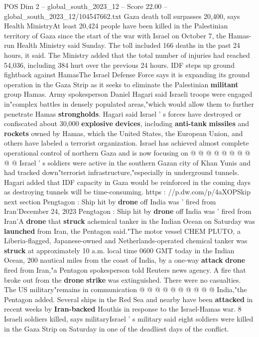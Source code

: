 \begin{textsample}{POS Dim 2 – global\_south\_2023\_12 – Score 22.00 – global\_south\_2023\_12/104547662.txt}  \label{ex:f2_pos_154}
Gaza death toll surpasses 20,400, says Health MinistryAt least 20,424 people have been killed in the Palestinian territory of Gaza since the start of the war with Israel on October 7, the Hamas-run Health Ministry said Sunday.
The toll included 166 deaths in the past 24 hours, it said.
The Ministry added that the total number of injuries had reached 54,036, including 384 hurt over the previous 24 hours.
IDF steps up ground fightback against HamasThe Israel Defense Force says it is expanding its ground operation in the Gaza Strip as it seeks to eliminate the Palestinian \textbf{militant} group Hamas.
Army spokesperson Daniel Hagari said Israeli troops were engaged in"complex battles in densely populated areas,"which would allow them to further penetrate Hamas \textbf{strongholds}.
Hagari said Israel ' s forces have destroyed or confiscated about 30,000 \textbf{explosive} \textbf{devices}, including \textbf{anti-tank} \textbf{missiles} and \textbf{rockets} owned by Hamas, which the United States, the European Union, and others have labeled a terrorist organization.
Israel has achieved almost complete operational control of northern Gaza and is now focusing on @ @ @ @ @ @ @ @ @ @ Israel ' s soldiers were active in the southern Gazan city of Khan Yunis and had tracked down"terrorist infrastructure,"especially in underground tunnels.
Hagari added that IDF capacity in Gaza would be reinforced in the coming days as destroying tunnels will be time-consuming. https : //p.dw.com/p/4aXOPSkip next section Pengtagon : Ship hit by \textbf{drone} off India was ' fired from Iran'December 24, 2023 Pengtagon : Ship hit by \textbf{drone} off India was ' fired from Iran'A \textbf{drone} that \textbf{struck} achemical tanker in the Indian Ocean on Saturday was \textbf{launched} from Iran, the Pentagon said."The motor vessel CHEM PLUTO, a Liberia-flagged, Japanese-owned and Netherlands-operated chemical tanker was \textbf{struck} at approximately 10 a.m. local time 0600 GMT today in the Indian Ocean, 200 nautical miles from the coast of India, by a one-way \textbf{attack} \textbf{drone} fired from Iran,"a Pentagon spokesperson told Reuters news agency.
A fire that broke out from the \textbf{drone} \textbf{strike} was extinguished.
There were no casualties.
The US military"remains in communication @ @ @ @ @ @ @ @ @ @ India,"the Pentagon added.
Several ships in the Red Sea and nearby have been \textbf{attacked} in recent weeks by \textbf{Iran-backed} Houthis in response to the Israel-Hamas war. 8 Israeli soldiers killed, says militaryIsrael ' s military said eight soldiers were killed in the Gaza Strip on Saturday in one of the deadliest days of the conflict.

\end{textsample}

